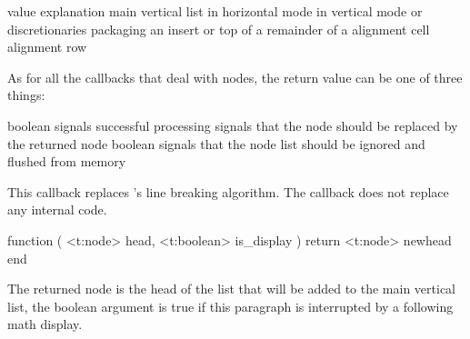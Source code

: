 \starttabulate[|l|p|]
\FL
\BC value                \BC explanation                                     \NC \NR
\ML
\NC {}       \NC main vertical list                              \NC \NR
\NC {}          \NC \type {\hbox} in horizontal mode                \NC \NR
\NC {} \NC \type {\hbox} in vertical mode                  \NC \NR
\NC {}          \NC \type {\vbox}                                   \NC \NR
\NC {}          \NC \type {\vtop}                                   \NC \NR
\NC {}         \NC \type {\halign} or \type {\valign}              \NC \NR
\NC {}          \NC discretionaries                                 \NC \NR
\NC {}        \NC packaging an insert                             \NC \NR
\NC {}       \NC \type {\vcenter}                                \NC \NR
\NC {}     \NC \type {\localleftbox} or \type {\localrightbox} \NC \NR
\NC {}     \NC top of a \type {\vsplit}                        \NC \NR
\NC {}    \NC remainder of a \type {\vsplit}                  \NC \NR
\NC {}     \NC alignment cell                                  \NC \NR
\NC {}       \NC alignment row                                   \NC \NR
\LL
\stoptabulate

As for all the callbacks that deal with nodes, the return value can be one of
three things:

\startitemize
\startitem
    boolean  signals successful processing
\stopitem
\startitem
     signals that the  node should be replaced by the
    returned node
\stopitem
\startitem
    boolean  signals that the  node list should be
    ignored and flushed from memory
\stopitem
\stopitemize

\stopsubsection

\startsubsection[title=linebreak_filter]

This callback replaces \LUATEX's line breaking algorithm. The callback does not
replace any internal code.

\starttyping[option=LUA]
function (
    <t:node>    head,
    <t:boolean> is_display
)
    return <t:node> newhead
end
\stoptyping

The returned node is the head of the list that will be added to the main vertical
list, the boolean argument is true if this paragraph is interrupted by a
following math display.

